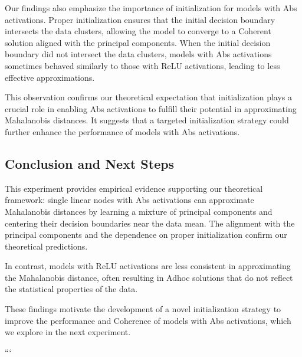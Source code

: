 Our findings also emphasize the importance of initialization for models with Abs activations. Proper initialization ensures that the initial decision boundary intersects the data clusters, allowing the model to converge to a Coherent solution aligned with the principal components. When the initial decision boundary did not intersect the data clusters, models with Abs activations sometimes behaved similarly to those with ReLU activations, leading to less effective approximations.

This observation confirms our theoretical expectation that initialization plays a crucial role in enabling Abs activations to fulfill their potential in approximating Mahalanobis distances. It suggests that a targeted initialization strategy could further enhance the performance of models with Abs activations.

\subsection{Conclusion and Next Steps}

This experiment provides empirical evidence supporting our theoretical framework: single linear nodes with Abs activations can approximate Mahalanobis distances by learning a mixture of principal components and centering their decision boundaries near the data mean. The alignment with the principal components and the dependence on proper initialization confirm our theoretical predictions.

In contrast, models with ReLU activations are less consistent in approximating the Mahalanobis distance, often resulting in Adhoc solutions that do not reflect the statistical properties of the data.

These findings motivate the development of a novel initialization strategy to improve the performance and Coherence of models with Abs activations, which we explore in the next experiment.

```